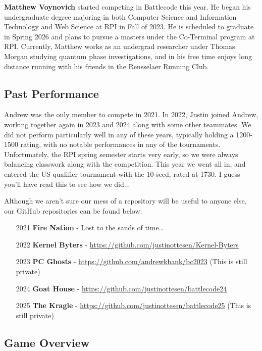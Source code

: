   \medskip

  \textbf{Matthew Voynovich} started competing in Battlecode this year. He began his undergraduate degree majoring in both Computer Science and Information Technology and Web Science at RPI in Fall of 2023. He is scheduled to graduate in Spring 2026 and plans to pursue a masters under the Co-Terminal program at RPI. Currently, Matthew works as an undergrad researcher under Thomas Morgan studying quantum phase investigations, and in his free time enjoys long distance running with his friends in the Rensselaer Running Club.

  \newpage
  \subsection{Past Performance}

  Andrew was the only member to compete in 2021. In 2022, Justin joined Andrew, working together again in 2023 and 2024 along with some other teammates. We did not perform particularly well in any of these years, typically holding a 1200-1500 rating, with no notable performances in any of the tournaments. Unfortunately, the RPI spring semester starts very early, so we were always balancing classwork along with the competition. This year we went all in, and entered the US qualifier tournament with the 10 seed, rated at 1730. I guess you'll have read this to see how we did...

  \medskip

  Although we aren't sure our mess of a repository will be useful to anyone else, our GitHub repositories can be found below:
  \begin{enumerate}
    \item[2021] \textbf{Fire Nation} - Lost to the sands of time\dots
    \item[2022] \textbf{Kernel Byters} - \url{https://github.com/justinottesen/Kernel-Byters}
    \item[2023] \textbf{PC Ghosts} - \url{https://github.com/andrewkbank/bc2023} (This is still private)
    \item[2024] \textbf{Goat House} - \url{https://github.com/justinottesen/battlecode24}
    \item[2025] \textbf{The Kragle} - \url{https://github.com/justinottesen/battlecode25} (This is still private)
  \end{enumerate}

  \subsection{Game Overview}

